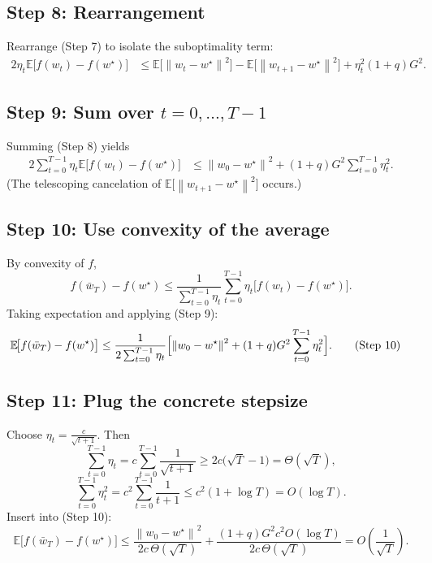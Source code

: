 \documentclass{article}
\newcommand{\E}{\mathbb{E}}
\newcommand{\norm}[1]{\left\| #1 \right\|}
\begin{document}
\subsection*{Step 8: Rearrangement}
Rearrange (Step 7) to isolate the suboptimality term:
\begin{align}
2\eta_t \E\!\bigl[f(w_t)-f(w^\star)\bigr]
&\le \E\!\bigl[\norm{w_t-w^\star}^2\bigr]
   -\E\!\bigl[\norm{w_{t+1}-w^\star}^2\bigr]
   +\eta_t^{2}(1+q)G^{2}. \tag{Step 8}
\end{align}

\subsection*{Step 9: Sum over $t=0,\dots,T-1$}
Summing (Step 8) yields
\begin{align}
2\sum_{t=0}^{T-1}\eta_t \E\!\bigl[f(w_t)-f(w^\star)\bigr]
&\le \norm{w_0-w^\star}^2
   + (1+q)G^{2}\sum_{t=0}^{T-1}\eta_t^{2}. \tag{Step 9}
\end{align}
(The telescoping cancelation of $\E\!\bigl[\norm{w_{t+1}-w^\star}^2\bigr]$ occurs.)

\subsection*{Step 10: Use convexity of the average}
By convexity of $f$,
\[
f(\bar w_T)-f(w^\star)\le\frac{1}{\sum_{t=0}^{T-1}\eta_t}
      \sum_{t=0}^{T-1}\eta_t\bigl[f(w_t)-f(w^\star)\bigr].
\]
Taking expectation and applying (Step 9):
\begin{align}
\E\!\bigl[f(\bar w_T)-f(w^\star)\bigr]
&\le \frac{1}{2\sum_{t=0}^{T-1}\eta_t}
    \Bigl[\norm{w_0-w^\star}^2
    +(1+q)G^{2}\sum_{t=0}^{T-1}\eta_t^{2}\Bigr]. \tag{Step 10}
\end{align}

\subsection*{Step 11: Plug the concrete stepsize}
Choose $\eta_t=\frac{c}{\sqrt{t+1}}$. Then
\[
\sum_{t=0}^{T-1}\eta_t = c\sum_{t=0}^{T-1}\frac{1}{\sqrt{t+1}}
   \ge 2c\bigl(\sqrt{T}-1\bigr)=\Theta(\sqrt{T}),
\]
\[
\sum_{t=0}^{T-1}\eta_t^{2}=c^{2}\sum_{t=0}^{T-1}\frac{1}{t+1}
   \le c^{2}(1+\log T)=O(\log T).
\]
Insert into (Step 10):
\[
\E\!\bigl[f(\bar w_T)-f(w^\star)\bigr]
\le \frac{\norm{w_0-w^\star}^2}{2c\,\Theta(\sqrt{T})}
    +\frac{(1+q)G^{2}c^{2}O(\log T)}{2c\,\Theta(\sqrt{T})}
 = O\!\left(\frac{1}{\sqrt{T}}\right). \tag{Step 11}
\]
\end{document}
